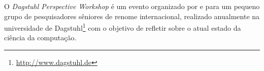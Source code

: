 
%
%


%


O {\it Dagstuhl Perspective Workshop} é um evento organizado por e para um
pequeno grupo de pesquisadores sêniores de renome internacional, realizado
anualmente na universidade de Dagstuhl\footnote{\url{http://www.dagstuhl.de}}
com o objetivo de refletir sobre o atual estado da ciência da computação.

